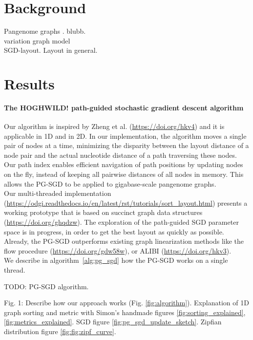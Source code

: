\documentclass[11pt,hidelinks]{article}
\begin{document}
\section{Background}

Pangenome graphs \cite{computational2016computational}. blubb.
\\
variation graph model
\\
SGD-layout. Layout in general.
\\

\section{Results}

\paragraph{The HOGHWILD! path-guided stochastic gradient descent algorithm}
Our algorithm is inspired by Zheng et al. (\url{https://doi.org/hkv4}) and it is applicable in 1D and in 2D.
In our implementation, the algorithm moves a single pair of nodes at a time, minimizing the disparity between the layout distance of a node pair and the actual nucleotide distance of a path traversing these nodes.
Our path index enables efficient navigation of path positions by updating nodes on the fly, instead of keeping all pairwise distances of all nodes in memory.
This allows the PG-SGD to be applied to gigabase-scale pangenome graphs. \\
Our multi-threaded implementation (\url{https://odgi.readthedocs.io/en/latest/rst/tutorials/sort_layout.html}) presents a working prototype that is based on succinct graph data structures (\url{https://doi.org/ghqdzw}).
The exploration of the path-guided SGD parameter space is in progress, in order to get the best layout as quickly as possible.
Already, the PG-SGD outperforms existing graph linearization methods like the flow procedure (\url{https://doi.org/gdw58w}), or ALIBI (\url{https://doi.org/hkv3}).
\\
We describe in algorithm~\ref{alg:pg_sgd} how the PG-SGD works on a single thread.
\begin{algorithm}
	\caption{TODO: PG-SGD algorithm.}
	\label{alg:pg_sgd}
\end{algorithm}

Fig. 1: Describe how our approach works (Fig. \ref{fig:algorithm}). Explanation of 1D graph sorting and metric with Simon's handmade figures \ref{fig:sorting_explained},\ref{fig:metrics_explained}. SGD figure \ref{fig:pg_sgd_update_sketch}. Zipfian distribution figure \ref{fig:fig:zipf_curve}.
\end{document}
